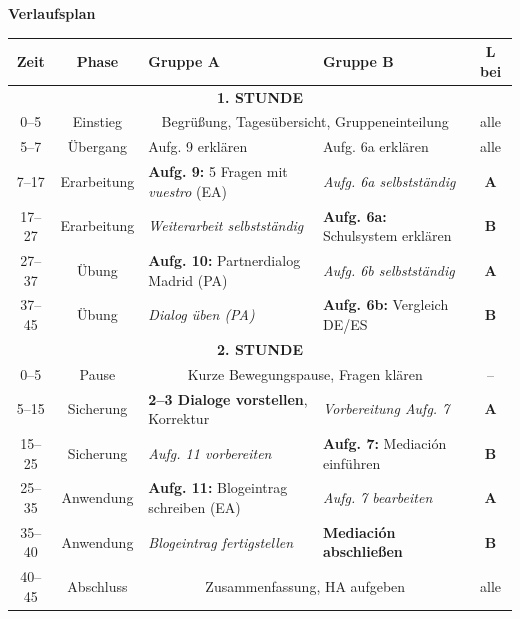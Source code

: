 \documentclass[11pt, a4paper]{article}
\begin{document}
\textbf{\large Verlaufsplan}

\vspace{0.2cm}

\footnotesize
\begin{tabularx}{\textwidth}{|c|c|X|X|c|}
\hline
\rowcolor{spanisch!20}
\textbf{Zeit} & \textbf{Phase} & \textbf{Gruppe A} & \textbf{Gruppe B} & \textbf{L bei} \\
\hline
\multicolumn{5}{|c|}{\cellcolor{hellgrau}\textbf{1. STUNDE}} \\
\hline
0--5 & Einstieg & \multicolumn{2}{c|}{Begrüßung, Tagesübersicht, Gruppeneinteilung} & alle \\
\hline
5--7 & Übergang & Aufg. 9 erklären & Aufg. 6a erklären & alle \\
\hline
7--17 & Erarbeitung & \textbf{Aufg. 9:} 5 Fragen mit \textit{vuestro} (EA) & \textit{Aufg. 6a selbstständig} & \textcolor{gruppeA}{\textbf{A}} \\
\hline
17--27 & Erarbeitung & \textit{Weiterarbeit selbstständig} & \textbf{Aufg. 6a:} Schulsystem erklären & \textcolor{gruppeB}{\textbf{B}} \\
\hline
27--37 & Übung & \textbf{Aufg. 10:} Partnerdialog Madrid (PA) & \textit{Aufg. 6b selbstständig} & \textcolor{gruppeA}{\textbf{A}} \\
\hline
37--45 & Übung & \textit{Dialog üben (PA)} & \textbf{Aufg. 6b:} Vergleich DE/ES & \textcolor{gruppeB}{\textbf{B}} \\
\hline
\multicolumn{5}{|c|}{\cellcolor{hellgrau}\textbf{2. STUNDE}} \\
\hline
0--5 & Pause & \multicolumn{2}{c|}{Kurze Bewegungspause, Fragen klären} & -- \\
\hline
5--15 & Sicherung & \textbf{2--3 Dialoge vorstellen}, Korrektur & \textit{Vorbereitung Aufg. 7} & \textcolor{gruppeA}{\textbf{A}} \\
\hline
15--25 & Sicherung & \textit{Aufg. 11 vorbereiten} & \textbf{Aufg. 7:} Mediación einführen & \textcolor{gruppeB}{\textbf{B}} \\
\hline
25--35 & Anwendung & \textbf{Aufg. 11:} Blogeintrag schreiben (EA) & \textit{Aufg. 7 bearbeiten} & \textcolor{gruppeA}{\textbf{A}} \\
\hline
35--40 & Anwendung & \textit{Blogeintrag fertigstellen} & \textbf{Mediación abschließen} & \textcolor{gruppeB}{\textbf{B}} \\
\hline
40--45 & Abschluss & \multicolumn{2}{c|}{Zusammenfassung, HA aufgeben} & alle \\
\hline
\end{tabularx}
\end{document}
